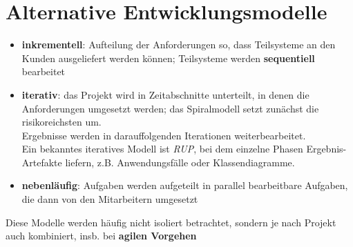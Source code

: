 \section{Alternative Entwicklungsmodelle}

\begin{tcolorbox}[title=Alternative Entwicklungsmodelle]
    \begin{itemize}
        \item \textbf{inkrementell}: Aufteilung der Anforderungen so, dass Teilsysteme an den Kunden ausgeliefert werden können; Teilsysteme werden \textbf{sequentiell} bearbeitet
        \item \textbf{iterativ}: das Projekt wird in Zeitabschnitte unterteilt, in denen die Anforderungen umgesetzt werden; das Spiralmodell  setzt zunächst die risikoreichsten um.\\
        Ergebnisse werden in darauffolgenden Iterationen weiterbearbeitet.\\
        Ein bekanntes iteratives Modell ist \textit{RUP}, bei dem einzelne Phasen Ergebnis-Artefakte liefern, z.B. Anwendungsfälle oder Klassendiagramme.
        \item \textbf{nebenläufig}: Aufgaben werden aufgeteilt in parallel bearbeitbare Aufgaben, die dann von den Mitarbeitern umgesetzt
    \end{itemize}

    \noindent
    Diese Modelle werden häufig nicht isoliert betrachtet, sondern je nach Projekt auch kombiniert, insb. bei \textbf{agilen Vorgehen}
\end{tcolorbox}
